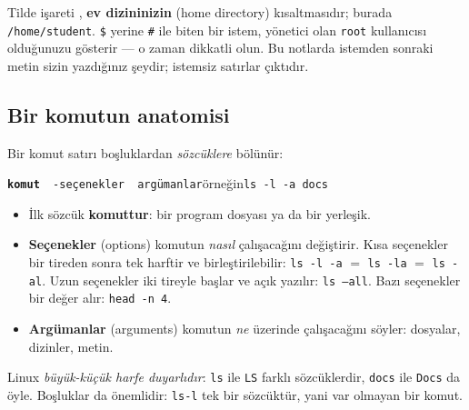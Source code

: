 \documentclass[11pt,a4paper]{article}
\newcommand{\term}[1]{\textbf{\color{mintdeep}#1}}
\newcommand{\cmd}[1]{\texttt{#1}}
\begin{document}
\begin{center}
\end{center}

Tilde işareti \texttt{\tl}, \term{ev dizininizin} (home directory) kısaltmasıdır; burada \texttt{/home/student}. \texttt{\$} yerine \texttt{\#} ile biten bir istem, yönetici olan \texttt{root} kullanıcısı olduğunuzu gösterir --- o zaman dikkatli olun. Bu notlarda istemden sonraki metin sizin yazdığınız şeydir; istemsiz satırlar çıktıdır.

\subsection{Bir komutun anatomisi}

Bir komut satırı boşluklardan \emph{sözcüklere} bölünür:
\begin{center}
\texttt{\textbf{komut}\ \ -seçenekler\ \ argümanlar}\qquad örneğin\qquad \texttt{ls -l -a docs}
\end{center}
\begin{itemize}
  \item İlk sözcük \term{komuttur}: bir program dosyası ya da bir yerleşik.
  \item \term{Seçenekler} (options) komutun \emph{nasıl} çalışacağını değiştirir. Kısa seçenekler bir tireden sonra tek harftir ve birleştirilebilir: \cmd{ls -l -a} $=$ \cmd{ls -la} $=$ \cmd{ls -al}. Uzun seçenekler iki tireyle başlar ve açık yazılır: \cmd{ls --all}. Bazı seçenekler bir değer alır: \cmd{head -n 4}.
  \item \term{Argümanlar} (arguments) komutun \emph{ne} üzerinde çalışacağını söyler: dosyalar, dizinler, metin.
\end{itemize}
Linux \emph{büyük-küçük harfe duyarlıdır}: \cmd{ls} ile \cmd{LS} farklı sözcüklerdir, \texttt{docs} ile \texttt{Docs} da öyle. Boşluklar da önemlidir: \cmd{ls-l} tek bir sözcüktür, yani var olmayan bir komut.
\end{document}
